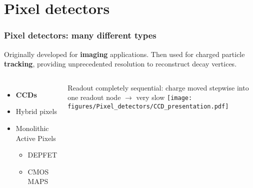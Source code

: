 \section{Pixel detectors}



    \begin{frame}
        \frametitle{Pixel detectors: many different types}
        Originally developed for \textbf{imaging} applications. Then used for charged particle \textbf{tracking}, providing unprecedented resolution to reconstruct decay vertices.\\%
        \pause
        \begin{columns}
                \begin{itemize}
                    \item \textbf{CCDs} 
                    \item Hybrid pixels 
                    \item Monolithic Active Pixels
                    \begin{itemize}
                        \item DEPFET %
                        \item CMOS MAPS
                    \end{itemize}
                \end{itemize}
            \bigskip
                Readout completely sequential: charge moved stepwise into one readout node $\rightarrow$ very slow
                \centering\texttt{[image: figures/Pixel\_detectors/CCD\_presentation.pdf]} 
        \end{columns}

    \end{frame}



